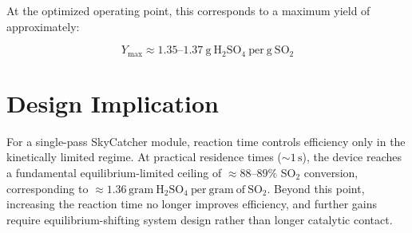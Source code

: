 \documentclass[a4paper,11pt]{article}
\begin{document}
At the optimized operating point, this corresponds to a maximum yield of approximately:

\begin{equation}
Y_{\max} \approx 1.35\text{--}1.37~\mathrm{g~H_2SO_4~per~g~SO_2}
\end{equation}

\section{Design Implication}

For a single-pass SkyCatcher module, reaction time controls efficiency only in the kinetically limited regime. At practical residence times ($\sim 1\,\mathrm{s}$), the device reaches a fundamental equilibrium-limited ceiling of $\approx 88\text{--}89\%$ SO$_2$ conversion, corresponding to $\approx 1.36\,\mathrm{gram\ H_2SO_4\ per\ gram\ of\ SO_2}$. Beyond this point, increasing the reaction time no longer improves efficiency, and further gains require equilibrium-shifting system design rather than longer catalytic contact.
\end{document}
